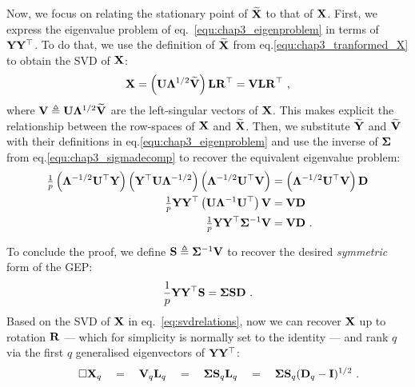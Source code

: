       Now, we focus on relating the stationary point of $\widetilde{\mathbf{X}}$ to that of $\mathbf{X}$. First, we express the eigenvalue problem of eq.~\eqref{equ:chap3_eigenproblem} in terms of $\mathbf{Y}\mathbf{Y}^\top$. To do that, we use the definition of $\widetilde{\mathbf{X}}$ from eq.\eqref{equ:chap3_tranformed_X} to obtain the SVD of $\mathbf{X}$:
      \begin{equation} \label{eq:svdrelations}
        \mathbf{X} = \left( \mathbf{U} \mathbf{\Lambda}^{1/2} \widetilde{\mathbf{V}} \right) \mathbf{L} \mathbf{R}^\top = \mathbf{V} \mathbf{L} \mathbf{R}^\top ~,
      \end{equation}
      where $\mathbf{V} \triangleq \mathbf{U} \mathbf{\Lambda}^{1/2} \widetilde{\mathbf{V}}$ are the left-singular vectors of $\mathbf{X}$. This makes explicit the relationship between the row-spaces of $\mathbf{X}$ and $\widetilde{\mathbf{X}}$. Then, we substitute $\mathbf{\widetilde{Y}}$ and $\mathbf{\widetilde{V}}$ with their definitions in eq.\eqref{equ:chap3_eigenproblem} and use the inverse of $\mathbf{\Sigma}$ from eq.\eqref{equ:chap3_sigmadecomp} to recover the equivalent eigenvalue problem:
      \begin{equation*}
        \begin{split}
          \tfrac{1}{p} \left( \mathbf{\Lambda}^{-1/2} \mathbf{U}^\top \mathbf{Y} \right) \left( \mathbf{Y}^\top \mathbf{U} \mathbf{\Lambda}^{-1/2} \right) \left( \mathbf{\Lambda}^{-1/2} \mathbf{U}^\top \mathbf{V} \right)
	  &= \left( \mathbf{\Lambda}^{-1/2} \mathbf{U}^\top \mathbf{V} \right) \mathbf{D} \\
	  \tfrac{1}{p} \mathbf{Y} \mathbf{Y}^\top \left( \mathbf{U} \mathbf{\Lambda}^{-1} \mathbf{U}^\top \right) \mathbf{V} &= \mathbf{V}\mathbf{D} \\
	  \tfrac{1}{p} \mathbf{Y} \mathbf{Y}^\top \mathbf{\Sigma}^{-1} \mathbf{V} &= \mathbf{V} \mathbf{D} ~.
        \end{split}
      \end{equation*}

      To conclude the proof, we define $\mathbf{S} \triangleq \mathbf{\Sigma}^{-1} \mathbf{V}$ to recover the desired \textit{symmetric} form of the GEP:
      \begin{equation*} \label{equ:chap3_rcaeigenproblem}
        \frac{1}{p} \mathbf{Y} \mathbf{Y}^\top \mathbf{S} = \mathbf{\Sigma} \mathbf{S} \mathbf{D} ~.
      \end{equation*}
      Based on the SVD of $\mathbf{X}$ in eq.~\eqref{eq:svdrelations}, now we can recover $\mathbf{X}$ up to rotation $\mathbf{R}$ --- which for simplicity is normally set to the identity --- and rank $q$ via the first $q$ generalised eigenvectors of $\mathbf{Y}\mathbf{Y}^\top$:
      \begin{align*} \label{equ:chap3_recoveredX}
	\tag*{$\square$}
        \mathbf{X}_q \quad
	= \quad \mathbf{V}_q \mathbf{L}_q \quad
	= \quad \mathbf{\Sigma} \mathbf{S}_q \mathbf{L}_q \quad
	= \quad \mathbf{\Sigma} \mathbf{S}_q (\mathbf{D}_q - \mathbf{I})^{1/2} ~.
      \end{align*}

